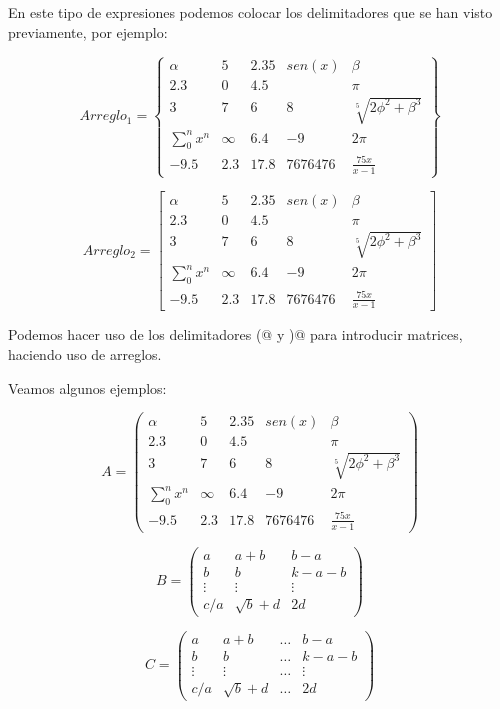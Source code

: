 \documentclass[letterpaper,12pt]{book}
\begin{document}
En este tipo de expresiones podemos colocar los delimitadores que se han visto previamente, por ejemplo:

\[
Arreglo_1 = \left\{\begin{array}{ccccc}
	\alpha & 5 & 2.35 & sen(x) & \beta \\
	2.3 & 0 & 4.5 & & \pi \\
	3 & 7 & 6 & 8 & \sqrt[5]{2 \phi^2 + \beta^3} \\
	\displaystyle\sum_{0}^{n} x^n & \infty & 6.4 & -9 & 2 \pi \\
	-9.5 & 2.3 & 17.8 & 7676476 & \frac{75 x}{x-1}
\end{array}
\right\}
\]

\[
Arreglo_2 = \left[ \begin{array}{ccccc}
	\alpha & 5 & 2.35 & sen(x) & \beta \\
	2.3 & 0 & 4.5 & & \pi \\
	3 & 7 & 6 & 8 & \sqrt[5]{2 \phi^2 + \beta^3} \\
	\displaystyle\sum_{0}^{n} x^n & \infty & 6.4 & -9 & 2 \pi \\
	-9.5 & 2.3 & 17.8 & 7676476 & \frac{75 x}{x-1}
\end{array}
\right]
\]

Podemos hacer uso de los delimitadores \verb@\left(@ y \verb@\right)@ para introducir matrices, haciendo uso
de arreglos. 

Veamos algunos ejemplos:

\[
A = \left( 
\begin{array}{ccccc}
	\alpha & 5 & 2.35 & sen(x) & \beta \\
	2.3 & 0 & 4.5 & & \pi \\
	3 & 7 & 6 & 8 & \sqrt[5]{2 \phi^2 + \beta^3} \\
	\displaystyle\sum_{0}^{n} x^n & \infty & 6.4 & -9 & 2 \pi \\
	-9.5 & 2.3 & 17.8 & 7676476 & \frac{75 x}{x-1}
\end{array}
\right)
\]

\[
B = \left( 
\begin{array}{lcc}
	a & a+b & b-a \\
	b & b & k-a-b \\
	\vdots & \vdots & \vdots \\
	c/a & \sqrt{b} + d & 2d
\end{array}
\right)
\]

\[
C = \left( 
\begin{array}{lccc}
	a & a+b & \hdots & b-a \\
	b & b & \hdots & k-a-b \\
	\vdots & \vdots & \hdots & \vdots \\
	c/a & \sqrt{b} + d & \hdots & 2d
\end{array}
\right)
\]
\end{document}
